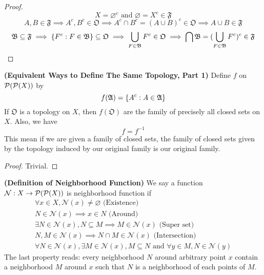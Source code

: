 \documentclass{report}
\begin{document}
\begin{proof}
\begin{equation}
X=\varnothing^c\text{ and }\varnothing=X^c\in \mathfrak{F}
\end{equation}
\begin{equation}
A,B\in \mathfrak{F}\implies A^c,B^c \in \mathfrak{O}\implies A^c \cap B^c=(A\cup B)^c \in \mathfrak{O} \implies A\cup  B \in \mathfrak{F}
\end{equation}
\begin{equation}
\mathfrak{B}\subseteq \mathfrak{F}\implies \{ F^c:F \in \mathfrak{B} \}\subseteq \mathfrak{O}\implies \bigcup_{F\in \mathfrak{B}}F^c \in \mathfrak{O}\implies \bigcap \mathfrak{B}= (\bigcup_{F \in\mathfrak{B}} F^c)^c \in \mathfrak{F}
\end{equation}
\end{proof}
\begin{theorem}
\label{0.1.3}
\textbf{(Equivalent Ways to Define The Same Topology, Part 1)} Define $f$ on $\mathcal{P}(\mathcal{P}(X))$ by 
\begin{equation}
f(\mathfrak{A})=\{ A^c:A\in \mathfrak{A} \}
\end{equation}
If $\mathfrak{O}$ is a topology on $X$, then  $f(\mathfrak{O})$ are the family of precisely all closed sets on $X$. Also, we have
\begin{equation}
f=f^{-1}
\end{equation}
This mean if we are given a family of closed sets, the family of closed sets given by the topology induced by our original family is our original family.   
\end{theorem}
\begin{proof}
Trivial. 
\end{proof}
\begin{definition}
\label{0.1.4}
\textbf{(Definition of Neighborhood Function)} We say a function $\mathcal{N}:X\rightarrow \mathcal{P}(\mathcal{P}(X))$ is neighborhood function if 
\begin{gather}
\forall x \in X,\mathcal{N}(x)\neq \varnothing\text{ (Existence) }\\
N \in \mathcal{N}(x)\implies x \in N\text{ (Around) }\\
\exists N \in \mathcal{N}(x), N\subseteq M\implies M\in \mathcal{N}(x)\text{ (Super set) }\\
N,M \in \mathcal{N}(x)\implies N \cap M\in \mathcal{N}(x)\text{ (Intersection) }\\
\forall N\in \mathcal{N}(x),\exists M\in \mathcal{N}(x), M \subseteq N\text{ and }\forall y \in M, N \in \mathcal{N}(y)
\end{gather}
The last property reads: every neighborhood $N$ around arbitrary point $x$ contain a neighborhood $M$ around $x$ such that $N$ is a neighborhood of each points of $M$.
\end{definition}
\end{document}
